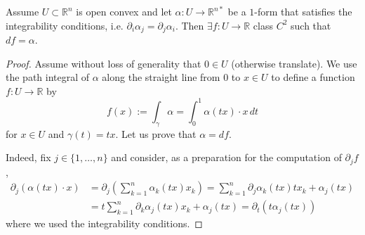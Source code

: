 \begin{lemma}\label{lem:conv-conv-dom}
	Assume $U \subset \mathbb{R}^{n}$ is open convex and let $\alpha: U \to \mathbb{R}^{n*}$ be a $1$-form that satisfies the integrability conditions, i.e. $\partial_{i} \alpha_{j} = \partial_{j} \alpha_{i}$. Then $\exists f: U \to \mathbb{R}$ class $C^{2}$ such that $df = \alpha$.
\end{lemma}
\begin{proof}


	Assume without loss of generality that $0 \in U$ (otherwise translate). We use the path integral of $\alpha$ along the straight line from $0$ to $x \in U$ to define a function $f: U \rightarrow \mathbb{R}$ by
	$$
		f(x):= \int_{\gamma } \alpha = \int_0^1 \alpha(t x) \cdot x \, dt
	$$
	for $x \in U$ and $\gamma(t) = tx$. Let us prove that $\alpha = df$.

	Indeed, fix $j \in\{1, \ldots, n\}$ and consider, as a preparation for the computation of $\partial_j f$,
	\begin{align*}
		\partial_j(\alpha(tx) \cdot x) & =\partial_j\left(\sum_{k=1}^n \alpha_k(t x) x_k\right)
		=\sum_{k=1}^n \partial_j \alpha_k(t x) t x_k+\alpha _j(t x)
		\\ &=  t\sum_{k=1}^n \partial_k \alpha _j(t x) x_k+\alpha _j(t x)
		=\partial_t\left(t \alpha _j(t x)\right)
	\end{align*}
	where we used the integrability conditions.
	

\end{proof}
